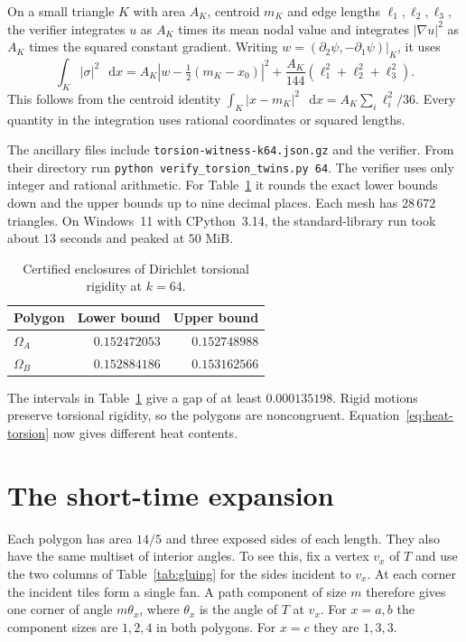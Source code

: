 \documentclass[11pt]{article}
\newcommand{\twinA}{\Omega_A}
\newcommand{\twinB}{\Omega_B}
\newcommand{\dd}{\mathop{}\!\mathrm{d}}
\begin{document}
On a small triangle
$K$ with area $A_K$, centroid $m_K$ and edge lengths $\ell_1,\ell_2,\ell_3$,
the verifier integrates $u$ as $A_K$ times its mean nodal value and
integrates $|\nabla u|^2$ as $A_K$ times the squared constant gradient.
Writing $w=(\partial_2\psi,-\partial_1\psi)|_K$, it uses
\[
 \int_K|\sigma|^2\,\dd x
   = A_K\left|w-\tfrac12(m_K-x_0)\right|^2
     +\frac{A_K}{144}(\ell_1^2+\ell_2^2+\ell_3^2).
\]
This follows from the centroid identity
$\int_K|x-m_K|^2\,\dd x=A_K\sum_i\ell_i^2/36$. Every quantity in the
integration uses rational coordinates or squared lengths.

The ancillary files include \texttt{torsion-witness-k64.json.gz} and
the verifier. From their directory run
\mbox{\texttt{python verify\_torsion\_twins.py 64}}. The verifier uses
only integer and rational arithmetic. For Table~\ref{tab:bounds} it
rounds the exact lower bounds down and the upper bounds up to nine
decimal places. Each mesh has $28\,672$ triangles. On Windows~11 with
CPython~3.14, the standard-library run took about $13$ seconds and
peaked at $50$ MiB.

\begin{table}[htb]
\centering
\begin{tabular}{@{}lrr@{}}
\toprule
Polygon & Lower bound & Upper bound\\
\midrule
$\twinA$ & $0.152472053$ & $0.152748988$\\
$\twinB$ & $0.152884186$ & $0.153162566$\\
\bottomrule
\end{tabular}
\caption{Certified enclosures of Dirichlet torsional rigidity at $k=64$.}
\label{tab:bounds}
\end{table}

The intervals in Table~\ref{tab:bounds} give a gap of at least
$0.000135198$. Rigid motions preserve torsional rigidity, so the
polygons are noncongruent. Equation~\eqref{eq:heat-torsion} now gives
different heat contents.

\section{The short-time expansion}\label{sec:short-time}

Each polygon has area $14/5$ and three exposed sides of each length.
They also have the same multiset of interior angles. To see this,
fix a vertex $v_x$ of $T$ and use the two columns of
Table~\ref{tab:gluing} for the sides incident to $v_x$. At each
corner the incident tiles form a single fan. A path component of
size $m$ therefore gives one corner of angle $m\theta_x$, where
$\theta_x$ is the angle of $T$ at $v_x$.
For $x=a,b$ the component sizes are $1,2,4$ in both polygons. For
$x=c$ they are $1,3,3$.
\end{document}

